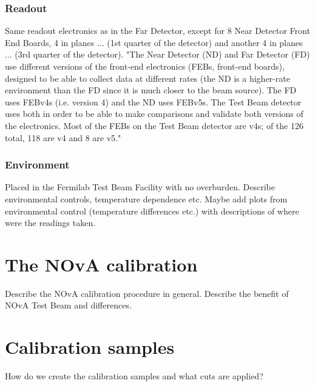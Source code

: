 \documentclass[12pt,a4paper]{article}
\begin{document}
\subsubsection*{Readout}
Same readout electronics as in the Far Detector, except for 8 Near Detector Front End Boards, 4 in planes ... (1st quarter of the detector) and another 4 in planes ... (3rd quarter of the detector).
"The Near Detector (ND) and Far Detector (FD) use different versions of the front-end electronics (FEBs, front-end boards), designed to be able to collect data at different rates (the ND is a higher-rate environment than the FD since it is much closer to the beam source). The FD uses FEBv4s (i.e. version 4) and the ND uses FEBv5s. The Test Beam detector uses both in order to be able to make comparisons and validate both versions of the electronics. Most of the FEBs on the Test Beam detector are v4s; of the 126 total, 118 are v4 and 8 are v5."%

\subsubsection*{Environment}
Placed in the Fermilab Test Beam Facility with no overburden. Describe environmental controls, temperature dependence etc. Maybe add plots from environmental control (temperature differences etc.) with descriptions of where were the readings taken.


\section{The NOvA calibration}
Describe the NOvA calibration procedure in general. Describe the benefit of NOvA Test Beam and differences.

\section{Calibration samples}
How do we create the calibration samples and what cuts are applied?
\end{document}
